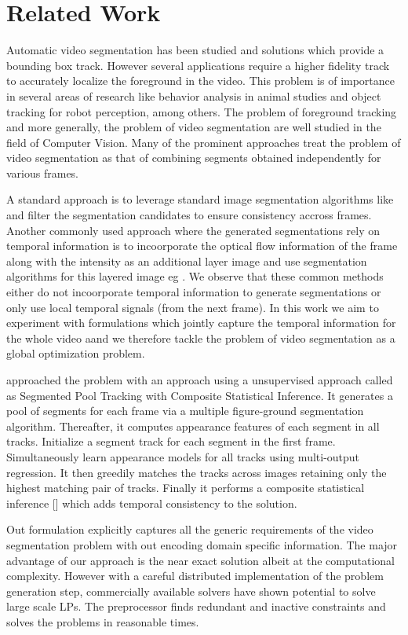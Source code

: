 \section{Related Work}

Automatic video segmentation has been studied and solutions which provide a 
bounding box track. However several applications require a higher fidelity 
track to accurately localize the foreground in the video. This problem is of 
importance in several areas of research like behavior analysis in animal studies and object tracking for robot perception, among others.  The problem of foreground tracking and more generally, the problem of video segmentation are well studied in the field of Computer Vision. Many of the prominent approaches treat the problem of video segmentation as that of combining segments obtained independently for various frames. 

A standard approach is to leverage standard image segmentation algorithms like \cite{CPMC} and filter the segmentation candidates to ensure consistency accross frames. Another commonly used approach where the generated segmentations rely on temporal information is to incoorporate the optical flow information of the frame along with the intensity as an additional layer image and use segmentation algorithms for this layered image eg \cite{LeordeanuSS12}. We observe that these common methods either do not incoorporate temporal information to generate segmentations or only use local temporal signals (from the next frame). In this work we aim to experiment with formulations which jointly capture the temporal information for the whole video aand we therefore tackle the problem of video segmentation as a global optimization problem.

\cite{li2013video} approached the problem with an approach using a unsupervised
approach called as Segmented Pool Tracking with Composite Statistical Inference.
It generates a pool of segments for each frame via a multiple figure-ground segmentation algorithm. Thereafter, it computes appearance features of each segment in all tracks. Initialize a segment track for each segment in the first frame. Simultaneously learn appearance models for all tracks using multi-output regression. 
It then greedily matches the tracks across images retaining only the highest matching pair of tracks. Finally it performs a composite statistical inference [\cite{li2013Composite}] which adds temporal consistency to the solution.

Out formulation explicitly captures all the generic requirements of the video
 segmentation problem with out encoding domain specific information. The major 
 advantage of our approach is the near exact solution albeit at the computational complexity. However with a careful distributed implementation of the problem
  generation step, commercially available solvers have shown potential to solve
  large scale LPs. The preprocessor finds redundant and inactive constraints and 
  solves the problems in reasonable times. 
